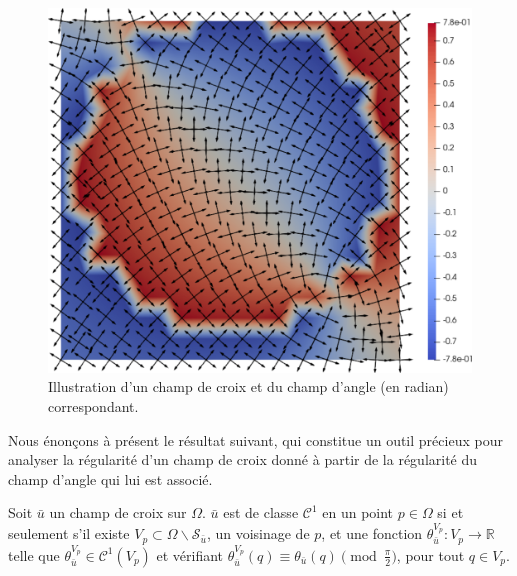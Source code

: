 \begin{figure}[!h]
  \centering
  \includegraphics[scale=0.35]{images/cross_ang_field.pdf}
  \caption{Illustration d'un champ de croix et du champ d'angle (en radian) correspondant.}
  \label{fig:cross_field}
\end{figure}


Nous énonçons à présent le résultat suivant, qui constitue un outil précieux pour analyser la régularité d'un champ de croix donné à partir de la régularité du champ d'angle qui lui est associé.

\begin{proposition}
    \label{prop:angular_cont}
    Soit $\bar{u}$ un champ de croix sur $\Omega$. $\bar{u}$ est de classe $\mathcal{C}^1$ en un point $p\in\Omega$ si et seulement s'il existe $V_p\subset \Omega \backslash \mathcal{S}_{\bar{u}}$, un voisinage de $p$, et une fonction $\theta_{\bar{u}}^{V_p}:V_p \rightarrow \mathbb{R}$ telle que $\theta_{\bar{u}}^{V_p}\in \mathcal{C}^1(V_p)$ et vérifiant $\theta_{\bar{u}}^{V_p}(q)\equiv\theta_{\bar{u}}(q) \pmod{\frac{\pi}{2}}$, pour tout $q\in V_p$.
\end{proposition}


